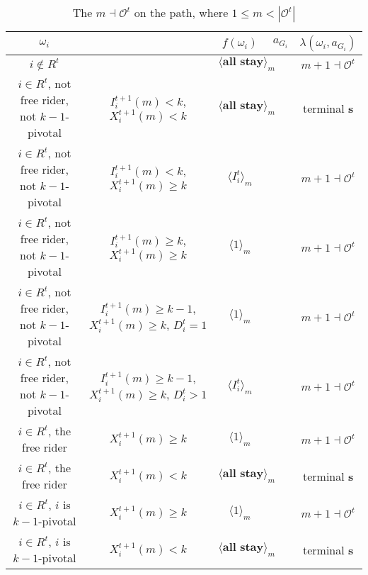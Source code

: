 \documentclass[12pt,letter]{article}
\newcommand{\Omicron}{\mathcal{O}}
\theoremstyle{definition}
\theoremstyle{remark}
\theoremstyle{claim}
\begin{document}
\begin{landscape}
\begin{table}[!htbp]
\caption{The $m\dashv\Omicron^t$ on the path, where $1\leq m < |\Omicron^t|$}
\label{table:eqm_path_ot1}
\begin{center}
\begin{tabular}{c c | c | c | c}
$\omega_i$ 	 & 	   &	$f(\omega_i)$  &	$a_{G_i}$ & $\lambda(\omega_i,a_{G_i})$ \\
\hline
\hline
$i\notin R^t$  	& 								& $\langle \textbf{all stay} \rangle_m$		&  			& $m+1\dashv \Omicron^t$ \\
$i\in R^t$, not free rider, not $k-1$-pivotal		 	&  $I^{t+1}_i(m)< k$, $X^{t+1}_i(m)<k$			&  $\langle \textbf{all stay} \rangle_m$	& 	& terminal \textbf{s} \\
$i\in R^t$, not free rider, not $k-1$-pivotal	  	& $I^{t+1}_i(m)<k$, $X^{t+1}_i(m)\geq k$		    & $\langle I^t_i \rangle_m$ 		&    			& $m+1\dashv \Omicron^t$ \\
$i\in R^t$, not free rider, not $k-1$-pivotal	 	&  $I^{t+1}_i(m)\geq k$, $X^{t+1}_i(m)\geq k$	& $\langle 1 \rangle_m$ 	& 	& $m+1\dashv \Omicron^t$ \\
$i\in R^t$, not free rider, not $k-1$-pivotal	 	&  $I^{t+1}_i(m)\geq k-1$, $X^{t+1}_i(m)\geq k$, $D^t_i=1$	& $\langle 1 \rangle_m$ 	& 	& $m+1\dashv \Omicron^t$ \\
$i\in R^t$, not free rider, not $k-1$-pivotal	 	&  $I^{t+1}_i(m)\geq k-1$, $X^{t+1}_i(m)\geq k$, $D^t_i>1$	& $\langle I^t_i \rangle_m$ 	& 	& $m+1\dashv \Omicron^t$ \\
$i\in R^t$, the free rider  	&  $X^{t+1}_i(m)\geq k$ & $\langle 1 \rangle_m$ 		& 				  & $m+1\dashv \Omicron^t$ \\
$i\in R^t$, the free rider  	&  		$X^{t+1}_i(m)<k$					&  $\langle \textbf{all stay} \rangle_m$		& 										  & terminal \textbf{s} \\
$i\in R^t$, $i$ is $k-1$-pivotal  	&  $X^{t+1}_i(m)\geq k$ & $\langle 1 \rangle_m$ 	& 											 & $m+1\dashv \Omicron^t$ \\
$i\in R^t$, $i$ is $k-1$-pivotal  	&  	$X^{t+1}_i(m)<k$		&  $\langle \textbf{all stay} \rangle_m$	& 											 & terminal \textbf{s} \\
\hline

\end{tabular}
\end{center}
\end{table}
\end{landscape}
\end{document}
